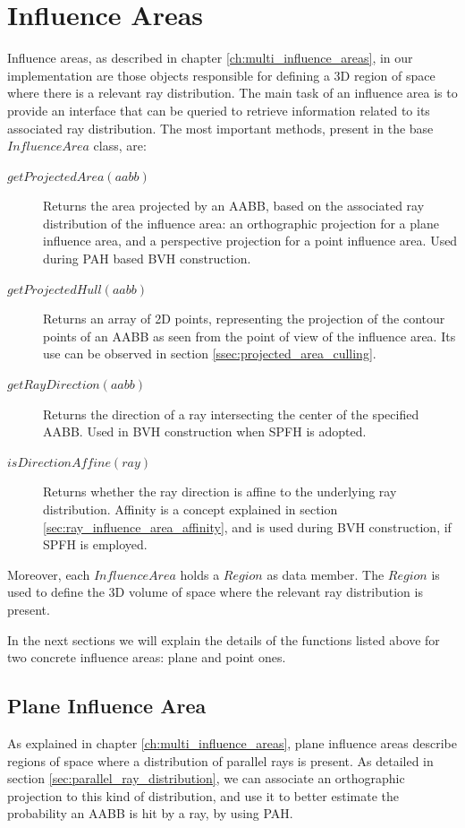 \documentclass{PoliMi_MasterThesis}
\begin{document}
\section{Influence Areas} \label{sec:influence_areas}
Influence areas, as described in chapter \ref{ch:multi_influence_areas}, in our implementation are those objects responsible for defining a 3D region of space where there is a relevant ray distribution. The main task of an influence area is to provide an interface that can be queried to retrieve information related to its associated ray distribution. The most important methods, present in the base $InfluenceArea$ class, are:
\begin{description}
	\item[\boldmath$getProjectedArea(aabb)$] Returns the area projected by an AABB, based on the associated ray distribution of the influence area: an orthographic projection for a plane influence area, and a perspective projection for a point influence area. Used during PAH based BVH construction.
	\item[\boldmath$getProjectedHull(aabb)$] Returns an array of 2D points, representing the projection of the contour points of an AABB as seen from the point of view of the influence area. Its use can be observed in section \ref{ssec:projected_area_culling}.
	\item[\boldmath$getRayDirection(aabb)$] Returns the direction of a ray intersecting the center of the specified AABB. Used in BVH construction when SPFH is adopted.
	\item[\boldmath$isDirectionAffine(ray)$] Returns whether the ray direction is affine to the underlying ray distribution. Affinity is a concept explained in section \ref{sec:ray_influence_area_affinity}, and is used during BVH construction, if SPFH is employed.
\end{description}

Moreover, each $InfluenceArea$ holds a $Region$ as data member. The $Region$ is used to define the 3D volume of space where the relevant ray distribution is present.

In the next sections we will explain the details of the functions listed above for two concrete influence areas: plane and point ones.

\subsection{Plane Influence Area} \label{ssec:plane_influence_area}
As explained in chapter \ref{ch:multi_influence_areas}, plane influence areas describe regions of space where a distribution of parallel rays is present. As detailed in section \ref{sec:parallel_ray_distribution}, we can associate an orthographic projection to this kind of distribution, and use it to better estimate the probability an AABB is hit by a ray, by using PAH.
\end{document}
